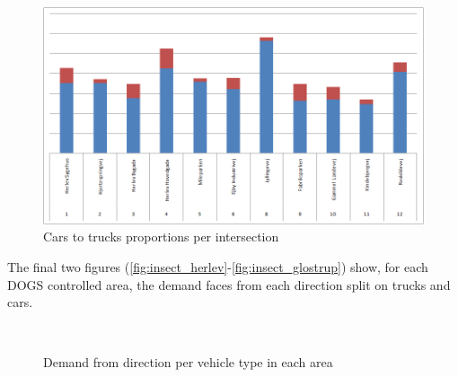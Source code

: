 \begin{figure}[htbp]
\centering
\includegraphics[scale=0.40]{cars_vs_trucks_all_intersections.png}
\caption{Cars to trucks proportions per intersection}
\label{fig:cars2trucks_insect}
\end{figure}

The final two figures (\ref{fig:insect_herlev}-\ref{fig:insect_glostrup}) show, for each DOGS controlled area, the demand faces from each direction split on trucks and cars. 

\begin{figure}[htbp]
\centering
{} \\
    
\caption{Demand from direction per vehicle type in each area}
\end{figure}

